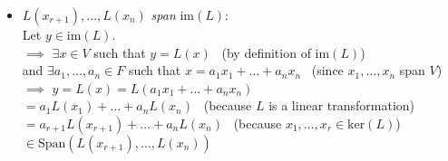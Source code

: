 \documentclass[
  12pt,
  a4paper,
  twoside]{article}
\theoremstyle{plain}
\theoremstyle{definition}
\begin{document}
\begin{itemize}
\item
  \(L(x_{r+1}),\dots, L(x_n)\) \emph{span} \(\mathrm{im}(L)\):\\
  Let \(y\in \text{im}(L)\).\\
  \(\implies\) \(\exists x\in V\) such that \(y=L(x)\) \hfill~{(by definition of \(\mathrm{im}(L)\))}\\
  and \(\exists a_1,\dots, a_n\in F\) such that \(x=a_1x_1+\dots+a_nx_n\) \hfill~{(since \(x_1,\dots, x_n\) span \(V\))}\\
  \(\implies\) \(y=L(x)=L(a_1x_1+\dots+a_nx_n)\)\\
  \hspace*{0.333em}\hspace*{0.333em}\hspace*{0.333em}\hspace*{0.333em}\hspace*{0.333em}\hspace*{0.333em}\hspace*{0.333em}\hspace*{0.333em}\hspace*{0.333em}\hspace*{0.333em}\hspace*{0.333em}\hspace*{0.333em} \(=a_1L(x_1)+\dots+a_nL(x_n)\) \hfill~{(because \(L\) is a linear transformation)}\\
  \hspace*{0.333em}\hspace*{0.333em}\hspace*{0.333em}\hspace*{0.333em}\hspace*{0.333em}\hspace*{0.333em}\hspace*{0.333em}\hspace*{0.333em}\hspace*{0.333em}\hspace*{0.333em}\hspace*{0.333em}\hspace*{0.333em} \(=a_{r+1}L(x_{r+1})+\dots + a_nL(x_n)\) \hfill~{(because \(x_1,\dots,x_r\in\mathrm{ker}(L)\))}\\
  \hspace*{0.333em}\hspace*{0.333em}\hspace*{0.333em}\hspace*{0.333em}\hspace*{0.333em}\hspace*{0.333em}\hspace*{0.333em}\hspace*{0.333em}\hspace*{0.333em}\hspace*{0.333em}\hspace*{0.333em}\hspace*{0.333em} \(\in \mathrm{Span}(L(x_{r+1}),\dots, L(x_n))\)\\

\end{itemize}
\end{document}
